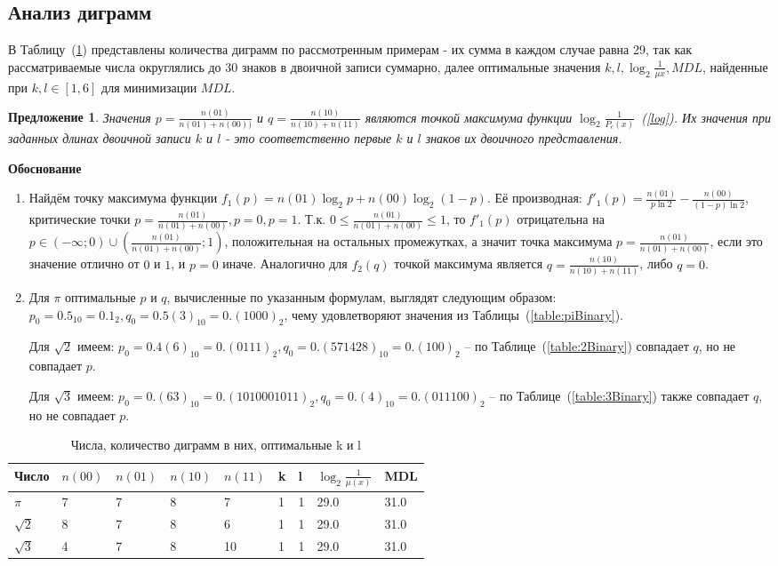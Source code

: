 \documentclass[12pt]{article}
\newtheorem{offer}{Предложение}
\begin{document}
	\subsection*{Анализ диграмм}
	В Таблицу~(\ref{table:digramsPi23}) представлены количества диграмм по рассмотренным примерам - их сумма в каждом случае равна 29, так как рассматриваемые числа округлялись до 30 знаков в двоичной записи суммарно, далее оптимальные значения $k,l,\log_2{\frac{1}{\mu{x}}},MDL$, найденные при $k,l\in[1,6]$ для минимизации $MDL$.
	\begin{offer}\label{derivative}Значения $p = \frac{n(01)}{n(01)+n(00))}$ и $q = \frac{n(10)}{n(10)+n(11)}$ являются точкой максимума функции $\log_2{\frac{1}{P_c(x)}}$~(\ref{log}). Их значения при заданных длинах двоичной записи $k$ и $l$ - это соответственно первые $k$ и $l$ знаков их двоичного представления.\end{offer}
	{\bf Обоснование}
	\begin{enumerate}
	\item Найдём точку максимума функции $f_1(p) = n(01)\log_2{p} + n(00)\log_2{(1-p)}$. Её производная: $f'_1(p) = \frac{n(01)}{p\ln{2}} - \frac{n(00)}{(1-p)\ln{2}}$, критические точки $p=\frac{n(01)}{n(01)+n(00)},p=0,p=1$. Т.к. $0\le\frac{n(01)}{n(01)+n(00)}\le1$, то $f'_1(p)$ отрицательна на $p\in(-\infty;0)\cup\left(\frac{n(01)}{n(01)+n(00)};1\right)$, положительная на остальных промежутках, а значит точка максимума $p = \frac{n(01)}{n(01)+n(00)}$, если это значение отлично от $0$ и $1$, и $p=0$ иначе. Аналогично для $f_2(q)$ точкой максимума является $q=\frac{n(10)}{n(10)+n(11)}$, либо $q=0$.
	
	\item Для $\pi$ оптимальные $p$ и $q$, вычисленные по указанным формулам, выглядят следующим образом: $p_0=0.5_{10} = 0.1_2, q_0=0.5(3)_{10}=0.(1000)_2$, чему удовлетворяют значения из Таблицы~(\ref{table:piBinary}).
	
	Для $\sqrt{2}$ имеем: $p_0=0.4(6)_{10}=0.(0111)_2, q_0=0.(571428)_{10}=0.(100)_2$ -- по Таблице~(\ref{table:2Binary}) совпадает $q$, но не совпадает $p$.
	
	Для $\sqrt{3}$ имеем: $p_0=0.(63)_{10}=0.(1010001011)_2, q_0=0.(4)_{10}=0.(011100)_2$ -- по Таблице~(\ref{table:3Binary}) также совпадает $q$, но не совпадает $p$.
	\end{enumerate}
	
	\begin{table}[!h]
		\caption{Числа, количество диграмм в них, оптимальные k и l}
		\label{table:digramsPi23}
		\begin{center}
			\begin{tabular}{|l|l|l|l|l|l|l|l|l|}
			\hline
			Число & $n(00)$ & $n(01)$ & $n(10)$ & $n(11)$ & k & l & $\log_2{\frac{1}{\mu(x)}}$& MDL\\
			\hline
			$\pi$ & 7 & 7 & 8 & 7 & 1 & 1 & 29.0 & 31.0\\
			\hline
			$\sqrt{2}$ & 8 & 7 & 8 & 6 & 1 & 1 & 29.0 & 31.0\\
			\hline
			$\sqrt{3}$ & 4 & 7 & 8 & 10 & 1 & 1 & 29.0 & 31.0\\
			\hline
		\end{tabular}
	\end{center}
	\end{table}
\end{document}
